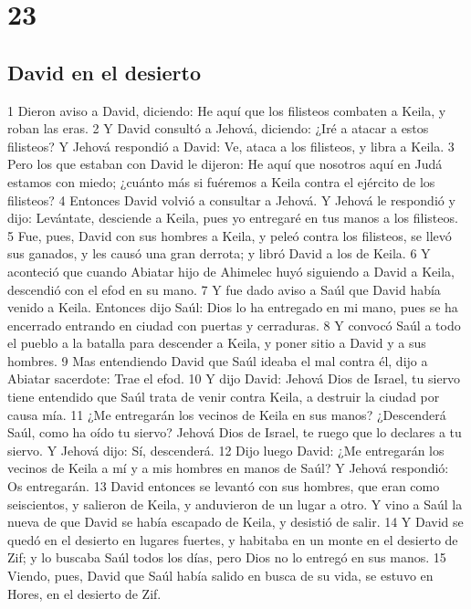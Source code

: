 \chapter{23}

\section*{David en el desierto}

1 Dieron aviso a David, diciendo: He aquí que los filisteos combaten a Keila, y roban las eras.
2 Y David consultó a Jehová, diciendo: ¿Iré a atacar a estos filisteos? Y Jehová respondió a David: Ve, ataca a los filisteos, y libra a Keila.
3 Pero los que estaban con David le dijeron: He aquí que nosotros aquí en Judá estamos con miedo; ¿cuánto más si fuéremos a Keila contra el ejército de los filisteos?
4 Entonces David volvió a consultar a Jehová. Y Jehová le respondió y dijo: Levántate, desciende a Keila, pues yo entregaré en tus manos a los filisteos.
5 Fue, pues, David con sus hombres a Keila, y peleó contra los filisteos, se llevó sus ganados, y les causó una gran derrota; y libró David a los de Keila.
6 Y aconteció que cuando Abiatar hijo de Ahimelec huyó siguiendo a David a Keila, descendió con el efod en su mano.
7 Y fue dado aviso a Saúl que David había venido a Keila. Entonces dijo Saúl: Dios lo ha entregado en mi mano, pues se ha encerrado entrando en ciudad con puertas y cerraduras.
8 Y convocó Saúl a todo el pueblo a la batalla para descender a Keila, y poner sitio a David y a sus hombres.
9 Mas entendiendo David que Saúl ideaba el mal contra él, dijo a Abiatar sacerdote: Trae el efod.
10 Y dijo David: Jehová Dios de Israel, tu siervo tiene entendido que Saúl trata de venir contra Keila, a destruir la ciudad por causa mía.
11 ¿Me entregarán los vecinos de Keila en sus manos? ¿Descenderá Saúl, como ha oído tu siervo? Jehová Dios de Israel, te ruego que lo declares a tu siervo. Y Jehová dijo: Sí, descenderá.
12 Dijo luego David: ¿Me entregarán los vecinos de Keila a mí y a mis hombres en manos de Saúl? Y Jehová respondió: Os entregarán.
13 David entonces se levantó con sus hombres, que eran como seiscientos, y salieron de Keila, y anduvieron de un lugar a otro. Y vino a Saúl la nueva de que David se había escapado de Keila, y desistió de salir.
14 Y David se quedó en el desierto en lugares fuertes, y habitaba en un monte en el desierto de Zif; y lo buscaba Saúl todos los días, pero Dios no lo entregó en sus manos.
15 Viendo, pues, David que Saúl había salido en busca de su vida, se estuvo en Hores, en el desierto de Zif.
